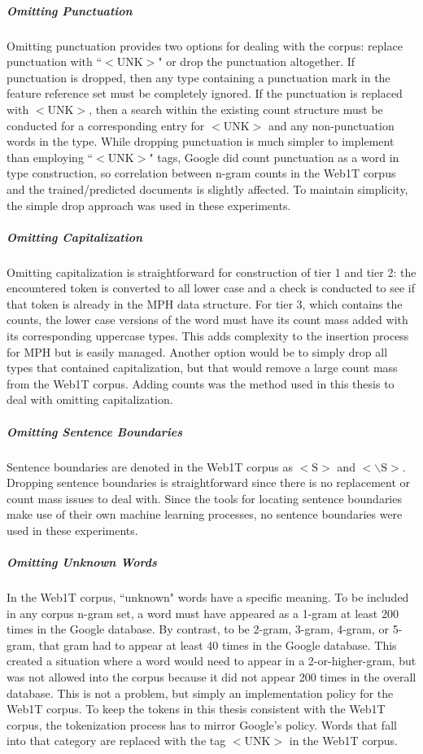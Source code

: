 			\subparagraph{Omitting Punctuation} Omitting punctuation provides two options for dealing with the corpus: replace punctuation with ``$<\text{UNK}>$" or drop the punctuation altogether.  If punctuation is dropped, then any type containing a punctuation mark in the feature reference set must be completely ignored.  If the punctuation is replaced with $<\text{UNK}>$, then a search within the existing count structure must be conducted for a corresponding entry for $<\text{UNK}>$ and any non-punctuation words in the type.  While dropping punctuation is much simpler to implement than employing ``$<\text{UNK}>$" tags, Google did count punctuation as a word in type construction, so correlation between n-gram counts in the Web1T corpus and the trained/predicted documents is slightly affected. To maintain simplicity, the simple drop approach was used in these experiments.
			\subparagraph{Omitting Capitalization} Omitting capitalization is straightforward for construction of tier 1 and tier 2: the encountered token is converted to all lower case and a check is conducted to see if that token is already in the MPH data structure.  For tier 3, which contains the counts, the lower case versions of the word must have its count mass added with its corresponding uppercase types.  This adds complexity to the insertion process for MPH but is easily managed.  Another option would be to simply drop all types that contained capitalization, but that would remove a large count mass from the Web1T corpus.  Adding counts was the method used in this thesis to deal with omitting capitalization.
			\subparagraph{Omitting Sentence Boundaries}  Sentence boundaries are denoted in the Web1T corpus as $<\text{S}>$ and $<\backslash \text{S}>$. Dropping sentence boundaries is straightforward since there is no replacement or count mass issues to deal with.  Since the tools for locating sentence boundaries make use of their own machine learning processes, no sentence boundaries were used in these experiments.
			\subparagraph{Omitting Unknown Words} In the Web1T corpus, ``unknown" words have a specific meaning.  To be included in any corpus n-gram set, a word must have appeared as a 1-gram at least 200 times in the Google database.  By contrast, to be 2-gram, 3-gram, 4-gram, or 5-gram, that gram had to appear at least 40 times in the Google database.  This created a situation where a word would need to appear in a 2-or-higher-gram, but was not allowed into the corpus because it did not appear 200 times in the overall database.  This is not a problem, but simply an implementation policy for the Web1T corpus.  To keep the tokens in this thesis consistent with the Web1T corpus, the tokenization process has to mirror Google's policy.  Words that fall into that category are replaced with the tag $<\text{UNK}>$ in the Web1T corpus.  %
		
